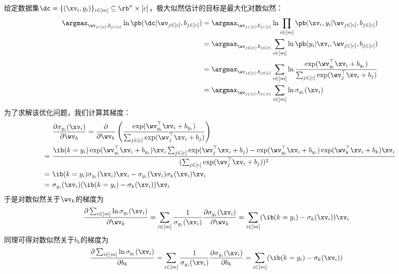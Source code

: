 \documentclass[a4paper,fleqn,fontset=none]{ctexart}
\begin{document}
给定数据集$\dc = \{(\xv_i, y_i) \}_{i \in [m]} \subseteq \rb^n \times [c]$，极大似然估计的目标是最大化对数似然：
\begin{align*}
    \argmax_{\wv_{j \in [c]}, b_{j \in [c]}} \ln \pb(\dc | \wv_{j \in [c]}, b_{j \in [c]})
     & = \argmax_{\wv_{j \in [c]}, b_{j \in [c]}} \ln \prod_{i \in [m]} \pb(\xv_i, y_i | \wv_{j \in [c]}, b_{j \in [c]})                                          \\
     & = \argmax_{\wv_{j \in [c]}, b_{j \in [c]}} \sum_{i \in [m]} \ln \pb(y_i | \xv_i, \wv_{j \in [c]}, b_{j \in [c]})                                           \\
     & = \argmax_{\wv_{j \in [c]}, b_{j \in [c]}} \sum_{i \in [m]} \ln \frac{\exp(\wv_{y_i}^\top \xv_i + b_{y_i})}{\sum_{j \in [c]} \exp(\wv_j^\top \xv_i + b_j)} \\
     & = \argmax_{\wv_{j \in [c]}, b_{j \in [c]}} \sum_{i \in [m]} \ln \sigma_{y_i} (\xv_i)
\end{align*}
为了求解该优化问题，我们计算其梯度：
\begin{align*}
      & ~ \frac{\partial \sigma_{y_i} (\xv_i)}{\partial \wv_k} = \frac{\partial}{\partial \wv_k} \left( \frac{\exp(\wv_{y_i}^\top \xv_i + b_{y_i})}{\sum_{j \in [c]} \exp(\wv_j^\top \xv_i + b_j)} \right)                                           \\
    = & ~ \frac{ \ib(k = y_i) \exp(\wv_{y_i}^\top \xv_i + b_{y_i}) \xv_i \sum_{j \in [c]} \exp(\wv_j^\top \xv_i + b_j) - \exp(\wv_{y_i}^\top \xv_i + b_{y_i}) \exp(\wv_k^\top \xv_i + b_k) \xv_i}{(\sum_{j \in [c]} \exp(\wv_j^\top \xv_i + b_j))^2} \\
    = & ~ \ib(k = y_i) \sigma_{y_i} (\xv_i) \xv_i - \sigma_{y_i} (\xv_i) \sigma_k (\xv_i) \xv_i                                                                                                                                                      \\
    = & ~ \sigma_{y_i} (\xv_i) (\ib(k = y_i) - \sigma_k (\xv_i)) \xv_i
\end{align*}
于是对数似然关于$\wv_k$的梯度为
\begin{align*}
    \frac{\partial \sum_{i \in [m]} \ln \sigma_{y_i} (\xv_i)}{\partial \wv_k}
     & = \sum_{i \in [m]} \frac{1}{\sigma_{y_i}(\xv_i)} \frac{\partial \sigma_{y_i} (\xv_i)}{\partial \wv_k} = \sum_{i \in [m]} (\ib(k = y_i) - \sigma_k (\xv_i)) \xv_i
\end{align*}
同理可得对数似然关于$b_k$的梯度为
\begin{align*}
    \frac{\partial \sum_{i \in [m]} \ln \sigma_{y_i} (\xv_i)}{\partial b_k}
     & = \sum_{i \in [m]} \frac{1}{\sigma_{y_i}(\xv_i)} \frac{\partial \sigma_{y_i} (\xv_i)}{\partial b_k} = \sum_{i \in [m]} (\ib(k = y_i) - \sigma_k (\xv_i))
\end{align*}
\end{document}
